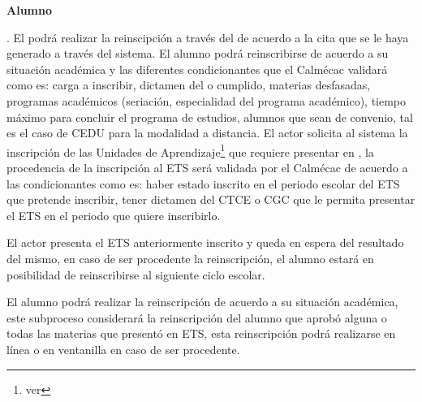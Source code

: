 \pagebreak

\begin{PDescripcion}	
	\Ppaso \textbf{Alumno}
	\begin{enumerate}
		\Ppaso[\PSubProceso] . El  podrá realizar la reinscipción a través del   de acuerdo a la cita que se le haya generado a través del sistema. El alumno podrá reinscribirse de acuerdo a su situación académica y las diferentes condicionantes que el Calmécac validará como es: carga a inscribir, dictamen del  o  cumplido, materias desfasadas, programas académicos (seriación, especialidad del programa académico), tiempo máximo para concluir el programa de estudios, alumnos que sean de convenio, tal es el caso de CEDU para la modalidad a distancia.
		\Ppaso[\PSubProceso] 
		El actor solicita al sistema  la inscripción de las Unidades de Aprendizaje\footnote{ver } que requiere presentar en , la procedencia de la inscripción al ETS será validada por el Calmécac de acuerdo a las condicionantes como es: haber estado inscrito en el periodo escolar del ETS que pretende inscribir, tener dictamen  del CTCE o CGC que le permita presentar el ETS en el periodo que quiere inscribirlo. %
		
		\Ppaso[\PSubProceso]  El actor presenta el ETS anteriormente inscrito y queda en espera del resultado del mismo, en caso de ser procedente la reinscripción, el alumno estará en posibilidad de reinscribirse al siguiente ciclo escolar.
		
		\Ppaso[\PSubProceso]  El alumno podrá realizar la reinscripción de acuerdo a su situación académica, este subproceso considerará la reinscripción del alumno que aprobó alguna o todas las materias que presentó en ETS, esta reinscripción podrá realizarse en línea o en ventanilla en caso de ser procedente.  
		

\end{enumerate}
\end{PDescripcion}
